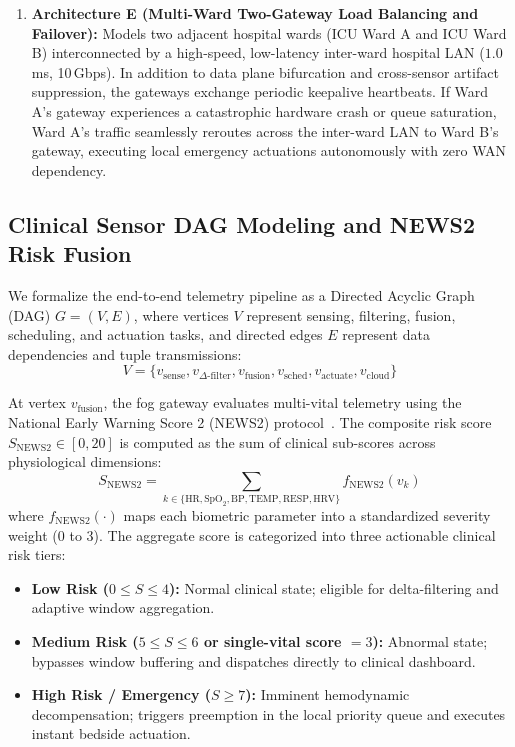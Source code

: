 \documentclass[conference]{IEEEtran}
\begin{document}
\begin{enumerate}
\begin{itemize}
    \end{itemize}
    \item \textbf{Architecture E (Multi-Ward Two-Gateway Load Balancing and Failover):} Models two adjacent hospital wards (ICU Ward A and ICU Ward B) interconnected by a high-speed, low-latency inter-ward hospital LAN ($1.0$\,ms, 10\,Gbps). In addition to data plane bifurcation and cross-sensor artifact suppression, the gateways exchange periodic keepalive heartbeats. If Ward A's gateway experiences a catastrophic hardware crash or queue saturation, Ward A's traffic seamlessly reroutes across the inter-ward LAN to Ward B's gateway, executing local emergency actuations autonomously with zero WAN dependency.
\end{enumerate}

\subsection{Clinical Sensor DAG Modeling and NEWS2 Risk Fusion}
We formalize the end-to-end telemetry pipeline as a Directed Acyclic Graph (DAG) $G = (V, E)$, where vertices $V$ represent sensing, filtering, fusion, scheduling, and actuation tasks, and directed edges $E$ represent data dependencies and tuple transmissions:
\begin{equation}
V = \{v_{\text{sense}}, v_{\Delta\text{-filter}}, v_{\text{fusion}}, v_{\text{sched}}, v_{\text{actuate}}, v_{\text{cloud}}\}
\end{equation}

At vertex $v_{\text{fusion}}$, the fog gateway evaluates multi-vital telemetry using the National Early Warning Score 2 (NEWS2) protocol~\cite{Rahmani2018}. The composite risk score $S_{\text{NEWS2}} \in [0, 20]$ is computed as the sum of clinical sub-scores across physiological dimensions:
\begin{equation}
S_{\text{NEWS2}} = \sum_{k \in \{\text{HR}, \text{SpO}_2, \text{BP}, \text{TEMP}, \text{RESP}, \text{HRV}\}} f_{\text{NEWS2}}(v_k)
\end{equation}
where $f_{\text{NEWS2}}(\cdot)$ maps each biometric parameter into a standardized severity weight ($0$ to $3$). The aggregate score is categorized into three actionable clinical risk tiers:
\begin{itemize}
    \item \textbf{Low Risk ($0 \le S \le 4$):} Normal clinical state; eligible for delta-filtering and adaptive window aggregation.
    \item \textbf{Medium Risk ($5 \le S \le 6$ or single-vital score $= 3$):} Abnormal state; bypasses window buffering and dispatches directly to clinical dashboard.
    \item \textbf{High Risk / Emergency ($S \ge 7$):} Imminent hemodynamic decompensation; triggers preemption in the local priority queue and executes instant bedside actuation.
\end{itemize}
\end{document}
